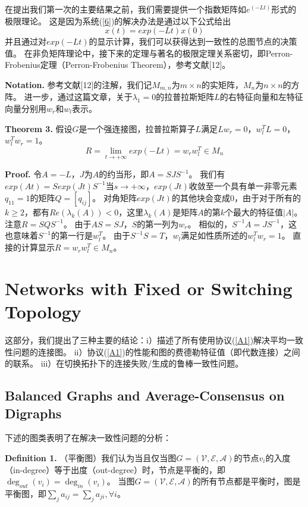 \documentclass{article}
\begin{document}
在提出我们第一次的主要结果之前，我们需要提供一个指数矩阵如$e^{(-Lt)}$形式的极限理论。
这是因为系统(\ref{6})的解决办法是通过以下公式给出
\begin{equation}
    x(t) = exp(-Lt)x(0)
\end{equation}
并且通过对$exp(-Lt)$的显示计算，我们可以获得达到一致性的总图节点的决策值。
在非负矩阵理论中，接下来的定理与著名的极限定理关系密切，即Perron-Frobenius定理（Perron-Frobenius Theorem），参考文献[12]。

\textbf{Notation.} 参考文献[12]的注解，我们记$M_{m,n}$为$m\times n$的实矩阵，$M_n$为$n \times n$的方阵。
进一步，通过这篇文章，关于$\lambda_1 = 0$的拉普拉斯矩阵$L$的右特征向量和左特征向量分别用$w_r$和$w_l$表示。

\textbf{Theorem 3.} 假设$G$是一个强连接图，拉普拉斯算子$L$满足$Lw_r=0$，$w_l^TL = 0$，$w_l^Tw_r=1$。
\begin{equation}
    R = \lim_{t\rightarrow +\infty} exp(-Lt) = w_r w_l^T \in M_n
\end{equation}

\textbf{Proof.} 令$A=-L$，$J$为$A$的约当形，即$A=SJS^{-1}$。
我们有$exp(At) = S exp(Jt) S^{-1}$当$s\rightarrow +\infty$，$exp(Jt)$收敛至一个具有单一非零元素$q_{11}=1$的矩阵$Q=[q_{ij}]$。
对角矩阵$exp(Jt)$的其他块会变成0，由于对于所有的$k\ge2$，都有$Re(\lambda_k(A))<0$，这里$\lambda_k(A)$是矩阵$A$的第$k$个最大的特征值$|A|$。
注意$R=SQS^{-1}$。
由于$AS=SJ$，$S$的第一列为$w_r$。
相似的，$S^{-1}A = JS^{-1}$，这也意味着$S^{-1}$的第一行是$w_l^T$。
由于$S^{-1}S=T$，$w_l$满足如性质所述的$w_l^Tw_r=1$。
直接的计算显示$R=w_rw_l^T\in M_n$。


\section{Networks with Fixed or Switching Topology}
这部分，我们提出了三种主要的结论：i）描述了所有使用协议(\ref{A1})解决平均一致性问题的连接图。
ii）协议(\ref{A1})的性能和图的费德勒特征值（即代数连接）之间的联系。
iii）在切换拓扑下的连接失败/生成的鲁棒一致性问题。

\subsection{Balanced Graphs and Average-Consensus on Digraphs}
下述的图类表明了在解决一致性问题的分析：

\textbf{Definition 1.} （平衡图）我们认为当且仅当图$G=(\mathcal{V}, \mathcal{E}, \mathcal{A})$的节点$v_i$的入度（in-degree）等于出度（out-degree）时，节点是平衡的，即$\deg_{out}(v_i)=\deg_{in}(v_i)$。
当图$G=(\mathcal{V}, \mathcal{E}, \mathcal{A})$的所有节点都是平衡时，图是平衡图，即$\sum_{j}a_{ij} = \sum_{j}a_{ji}, \forall i$。
\end{document}
